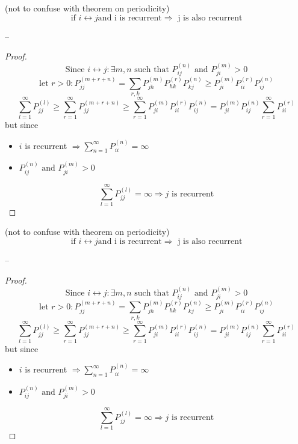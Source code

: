 \begin{theorem}
(not to confuse with theorem on periodicity)
$$\mbox{if } i\leftrightarrow j \mbox{and i is recurrent} \Rightarrow \mbox{ j is also recurrent}$$
\end{theorem}
--
\begin{proof}
$$\mbox{Since } i\leftrightarrow j : \exists m,n \mbox{ such that } P_{ij}^{(n)} \mbox{ and } P_{ji}^{(m)} > 0$$
$$\mbox{let } r>0 : P_{jj}^{(m+r+n)} = \sum_{r, k} P_{jh}^{(m)} P_{hk}^{(r)} P_{kj}^{(n)} \geq P_{ji}^{(m)}  P_{ii}^{(r)}  P_{ij}^{(n)}$$
$$\sum_{l=1}^\infty P_{jj}^{(l)} \geq \sum_{r=1}^\infty P_{jj}^{(m+r+n)} \geq \sum_{r=1}^\infty P_{ji}^{(m)}  P_{ii}^{(r)}  P_{ij}^{(n)} = P_{ji}^{(m)} P_{ij}^{(n)} \sum_{r=1}^\infty P_{ii}^{(r)}$$
but since \begin{itemize}
\item$i$ is recurrent $\Rightarrow \sum_{n=1}^\infty P_{ii}^{(n)} = \infty$
\item $P_{ij}^{(n)} \mbox{ and } P_{ji}^{(m)} > 0$
\end{itemize}
$$\sum_{l=1}^\infty P_{jj}^{(l)} = \infty \Rightarrow j \mbox{ is recurrent}$$

\end{proof}



\begin{theorem}
(not to confuse with theorem on periodicity)
$$\mbox{if } i\leftrightarrow j \mbox{and i is recurrent} \Rightarrow \mbox{ j is also recurrent}$$
\end{theorem}
--
\begin{proof}
$$\mbox{Since } i\leftrightarrow j : \exists m,n \mbox{ such that } P_{ij}^{(n)} \mbox{ and } P_{ji}^{(m)} > 0$$
$$\mbox{let } r>0 : P_{jj}^{(m+r+n)} = \sum_{r, k} P_{jh}^{(m)} P_{hk}^{(r)} P_{kj}^{(n)} \geq P_{ji}^{(m)}  P_{ii}^{(r)}  P_{ij}^{(n)}$$
$$\sum_{l=1}^\infty P_{jj}^{(l)} \geq \sum_{r=1}^\infty P_{jj}^{(m+r+n)} \geq \sum_{r=1}^\infty P_{ji}^{(m)}  P_{ii}^{(r)}  P_{ij}^{(n)} = P_{ji}^{(m)} P_{ij}^{(n)} \sum_{r=1}^\infty P_{ii}^{(r)}$$
but since \begin{itemize}
\item$i$ is recurrent $\Rightarrow \sum_{n=1}^\infty P_{ii}^{(n)} = \infty$  
\item $P_{ij}^{(n)} \mbox{ and } P_{ji}^{(m)} > 0$
\end{itemize}
$$\sum_{l=1}^\infty P_{jj}^{(l)} = \infty \Rightarrow j \mbox{ is recurrent}$$

\end{proof}

